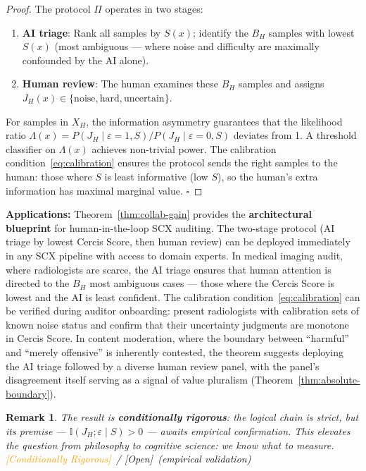 \documentclass[12pt,a4paper]{article}
\newtheorem{remark}[theorem]{Remark}
\newcommand{\conditionallyrigorous}{\textcolor{orange}{\small\textsf{[Conditionally Rigorous]}}}
\newcommand{\openquest}{\textcolor{red!70!black}{\small\textsf{[Open]}}}
\newcommand{\I}{\mathbb{I}}
\begin{document}
\begin{proof}
The protocol $\Pi$ operates in two stages:
\begin{enumerate}
    \item \textbf{AI triage}: Rank all samples by $S(x)$; identify the $B_H$
          samples with lowest $S(x)$ (most ambiguous — where noise and
          difficulty are maximally confounded by the AI alone).
    \item \textbf{Human review}: The human examines these $B_H$ samples and
          assigns $J_H(x) \in \{\text{noise}, \text{hard}, \text{uncertain}\}$.
\end{enumerate}
For samples in $X_H$, the information asymmetry guarantees that the
likelihood ratio $\Lambda(x) = P(J_H \mid \varepsilon=1, S) /
P(J_H \mid \varepsilon=0, S)$ deviates from 1.  A threshold classifier on
$\Lambda(x)$ achieves non-trivial power.  The calibration
condition~\eqref{eq:calibration} ensures the protocol sends the right
samples to the human: those where $S$ is least informative (low $S$), so
the human's extra information has maximal marginal value.  $\square$
\end{proof}

\medskip\noindent
\textbf{Applications:}
Theorem~\ref{thm:collab-gain} provides the \textbf{architectural blueprint}
for human-in-the-loop SCX auditing.  The two-stage protocol (AI triage by
lowest Cercis Score, then human review) can be deployed immediately in any
SCX pipeline with access to domain experts.  In medical imaging audit, where
radiologists are scarce, the AI triage ensures that human attention is
directed to the $B_H$ most ambiguous cases — those where the Cercis Score is
lowest and the AI is least confident.  The calibration
condition~\eqref{eq:calibration} can be verified during auditor onboarding:
present radiologists with calibration sets of known noise status and confirm
that their uncertainty judgments are monotone in Cercis Score.  In content
moderation, where the boundary between ``harmful'' and ``merely offensive''
is inherently contested, the theorem suggests deploying the AI triage followed
by a diverse human review panel, with the panel's disagreement itself serving
as a signal of value pluralism (Theorem~\ref{thm:absolute-boundary}).

\begin{remark}
The result is \textbf{conditionally rigorous}: the logical chain is strict,
but its premise — $\I(J_H; \varepsilon \mid S) > 0$ — awaits empirical
confirmation.  This elevates the question from philosophy to cognitive
science: we know \emph{what to measure}.  \conditionallyrigorous~/
\openquest~(empirical validation)
\end{remark}
\end{document}
